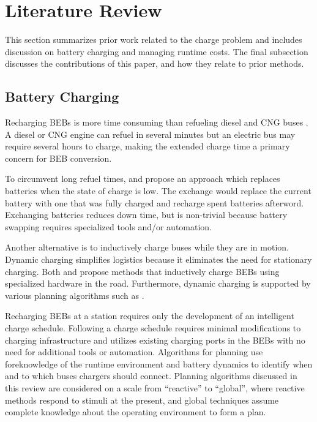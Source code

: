 \section{Literature Review\label{literature}}
\par This section summarizes prior work related to the charge problem and includes discussion on battery charging and managing runtime costs. The final subsection discusses the contributions of this paper, and how they relate to prior methods.
\subsection{Battery Charging}
Recharging BEBs is more time consuming than refueling diesel and CNG buses \cite{wei_optimizing_2018}. A diesel or CNG engine can refuel in several minutes but an electric bus may require several hours to charge, making the extended charge time a primary concern for BEB conversion.
\par To circumvent long refuel times, \cite{xian_zhang_optimal_2016} and \cite{jain_battery_2020} propose an approach which replaces batteries when the state of charge is low. The exchange would replace the current battery with one that was fully charged and recharge spent batteries afterword. Exchanging batteries reduces down time, but is non-trivial because battery swapping requires specialized tools and/or automation.
\par Another alternative is to inductively charge buses while they are in motion. Dynamic charging simplifies logistics because it eliminates the need for stationary charging. Both \cite{balde_electric_2019} and \cite{jeong_automatic_2018} propose methods that inductively charge BEBs using specialized hardware in the road. Furthermore, dynamic charging is supported by various planning algorithms such as \cite{csonka_optimization_2021, Alwesabi_2021_Novel, Alwesabi_2022_Robust}.
\par Recharging BEBs at a station 
requires only the development of an intelligent charge schedule. Following a charge schedule requires minimal modifications to charging infrastructure and utilizes existing charging ports in the BEBs with no need for additional tools or automation. Algorithms for planning use foreknowledge of the runtime environment and battery dynamics to identify when and to which buses chargers should connect. Planning algorithms discussed in this review are considered on a scale from ``reactive'' to ``global'', where reactive methods respond to stimuli at the present, and global techniques assume complete knowledge about the operating environment to form a plan.
